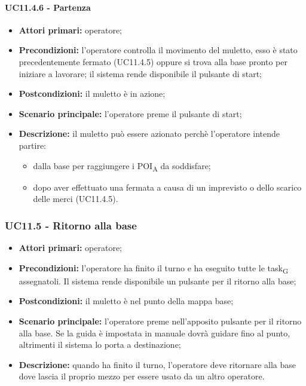 \paragraph{UC11.4.6 - Partenza}
\begin{itemize}
	\item 	\textbf{Attori primari:} operatore;
	\item 	\textbf{Precondizioni:} l'operatore controlla il movimento del muletto, esso è stato precedentemente fermato (UC11.4.5) oppure si trova alla base pronto per iniziare a lavorare; il sistema rende disponibile il pulsante di start;
	\item 	\textbf{Postcondizioni:} il muletto è in azione;
	\item 	\textbf{Scenario principale:} l'operatore preme il pulsante di start;
	\item 	\textbf{Descrizione:} il muletto può essere azionato perchè l'operatore intende partire:
	\begin{itemize}
		\item dalla base per raggiungere i \acrshort{POI}\textsubscript{A} da soddisfare;
		\item dopo aver effettuato una fermata a causa di un imprevisto o dello scarico delle merci (UC11.4.5).
	\end{itemize}
\end{itemize}


\subsubsection{UC11.5 - Ritorno alla base}
\begin{itemize}
	\item 	\textbf{Attori primari:} operatore;
	\item 	\textbf{Precondizioni:} l'operatore ha finito il turno e ha eseguito tutte le \gls{task}\textsubscript{G} assegnatoli. Il sistema rende disponibile un pulsante per il ritorno alla base;
	\item 	\textbf{Postcondizioni:} il muletto è nel punto della mappa base;
	\item 	\textbf{Scenario principale:} l'operatore preme nell'apposito pulsante per il ritorno alla base. Se la guida è impostata in manuale dovrà guidare fino al punto, altrimenti il sistema lo porta a destinazione;
	\item 	\textbf{Descrizione:} quando ha finito il turno, l'operatore deve ritornare alla base dove lascia il proprio mezzo per essere usato da un altro operatore.
\end{itemize}

